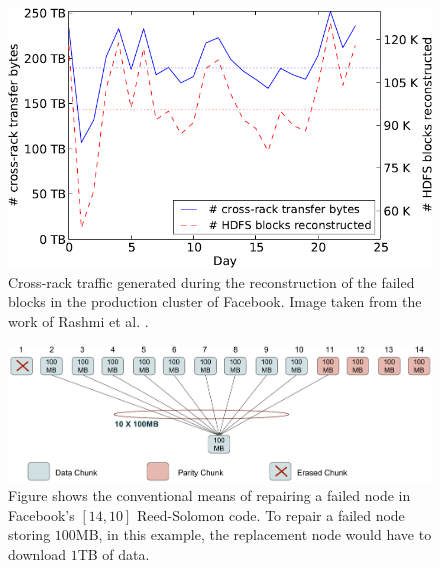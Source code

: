 \begin{multicols}{2}
		\begin{figure}[H]
		\centering
		\includegraphics{src/Figures/chap4/fb_repairtraffic.png} 
		\caption{Cross-rack traffic generated during the reconstruction of the failed blocks in the production cluster of Facebook. Image taken from the work of Rashmi et al. \cite{Rashmi_fbcluster}.}  \label{fig:FB_repairtraffic}    
		\end{figure}
\end{multicols}

			\begin{figure}[!h]
				\centering
				\includegraphics[scale=.6]{src/Figures/chap4/rs_14_10}  
				\caption{Figure shows the conventional means of repairing a failed node in Facebook's $[14,10]$ Reed-Solomon code. To repair a failed node storing $100$MB, in this example, the replacement node would have to download $1$TB of data.}  \label{fig:rs_14_10}    
			\end{figure}

